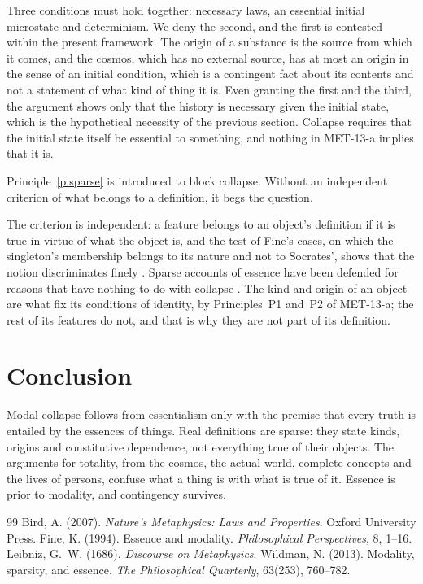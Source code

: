 \documentclass{situationist-preprint}
\begin{document}
\begin{reply}
Three conditions must hold together: necessary laws, an essential initial microstate and determinism. We deny the second, and the first is contested within the present framework. The origin of a substance is the source from which it comes, and the cosmos, which has no external source, has at most an origin in the sense of an initial condition, which is a contingent fact about its contents and not a statement of what kind of thing it is. Even granting the first and the third, the argument shows only that the history is necessary given the initial state, which is the hypothetical necessity of the previous section. Collapse requires that the initial state itself be essential to something, and nothing in MET-13-a implies that it is.
\end{reply}

\begin{objection}
Principle~\ref{p:sparse} is introduced to block collapse. Without an independent criterion of what belongs to a definition, it begs the question.
\end{objection}

\begin{reply}
The criterion is independent: a feature belongs to an object's definition if it is true in virtue of what the object is, and the test of Fine's cases, on which the singleton's membership belongs to its nature and not to Socrates', shows that the notion discriminates finely \citep{Fine1994}. Sparse accounts of essence have been defended for reasons that have nothing to do with collapse \citep{Wildman2013}. The kind and origin of an object are what fix its conditions of identity, by Principles~P1 and~P2 of MET-13-a; the rest of its features do not, and that is why they are not part of its definition.
\end{reply}

\section{Conclusion}

Modal collapse follows from essentialism only with the premise that every truth is entailed by the essences of things. Real definitions are sparse: they state kinds, origins and constitutive dependence, not everything true of their objects. The arguments for totality, from the cosmos, the actual world, complete concepts and the lives of persons, confuse what a thing is with what is true of it. Essence is prior to modality, and contingency survives.

\begin{thebibliography}{99}\small
{} Bird, A. (2007). \emph{Nature's Metaphysics: Laws and Properties}. Oxford University Press.
 Fine, K. (1994). Essence and modality. \emph{Philosophical Perspectives}, 8, 1--16.
 Leibniz, G.~W. (1686). \emph{Discourse on Metaphysics}.
 Wildman, N. (2013). Modality, sparsity, and essence. \emph{The Philosophical Quarterly}, 63(253), 760--782.
\end{thebibliography}
\end{document}
